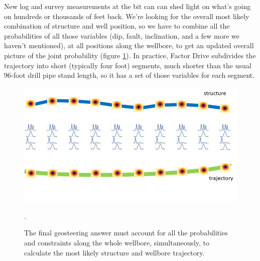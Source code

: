 \documentclass{tufte-handout}
\begin{document}

New log and survey measurements at the bit can can shed light on what's going on hundreds or thousands of feet back. We're looking for the overall most likely combination of structure and
well position, so we have to combine all the probabilities of all those variables (dip, fault,
inclination, and a few more we haven't mentioned), at all positions along the wellbore, to get
an updated overall picture of the joint probability (figure \ref{fig:the-answer}).
In practice, Factor Drive subdivides the trajectory into short (typically four foot) segments,
much shorter than the usual 96-foot drill pipe stand length, so it has a set of those
variables for each segment.

\begin{figure}[h]
    \includegraphics[width=\linewidth]{the-answer.png}
    \caption{
    The final geosteering answer must account for all the probabilities and constraints
    along the whole wellbore, simultaneously, to calculate the most likely structure and
    wellbore trajectory.
    }.
    \label{fig:the-answer}
\end{figure}





\end{document}
